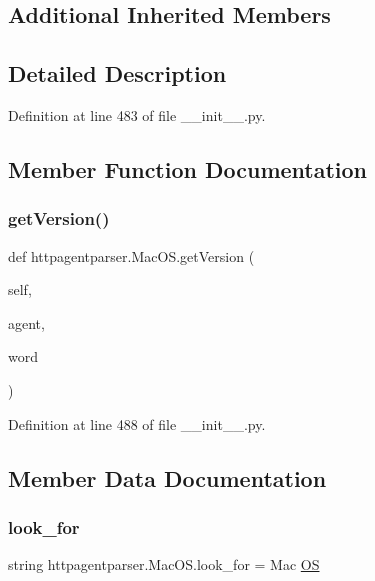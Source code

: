\subsection*{Additional Inherited Members}


\subsection{Detailed Description}


Definition at line 483 of file \+\_\+\+\_\+init\+\_\+\+\_\+.\+py.



\subsection{Member Function Documentation}
\hypertarget{classhttpagentparser_1_1_mac_o_s_ae088c256843ad145dc6ffa7acc35e99b}{}\label{classhttpagentparser_1_1_mac_o_s_ae088c256843ad145dc6ffa7acc35e99b} 
\subsubsection{\texorpdfstring{get\+Version()}{getVersion()}}
{\footnotesize\ttfamily def httpagentparser.\+Mac\+O\+S.\+get\+Version (\begin{DoxyParamCaption}\item[{}]{self,  }\item[{}]{agent,  }\item[{}]{word }\end{DoxyParamCaption})}



Definition at line 488 of file \+\_\+\+\_\+init\+\_\+\+\_\+.\+py.



\subsection{Member Data Documentation}
\hypertarget{classhttpagentparser_1_1_mac_o_s_ace9c37c9551d8c0ab5f95ff696c182e7}{}\label{classhttpagentparser_1_1_mac_o_s_ace9c37c9551d8c0ab5f95ff696c182e7} 
\subsubsection{\texorpdfstring{look\+\_\+for}{look\_for}}
{\footnotesize\ttfamily string httpagentparser.\+Mac\+O\+S.\+look\+\_\+for = \textquotesingle{}Mac \hyperlink{classhttpagentparser_1_1_o_s}{OS}\textquotesingle{}\hspace{0.3cm}{\ttfamily [static]}}




